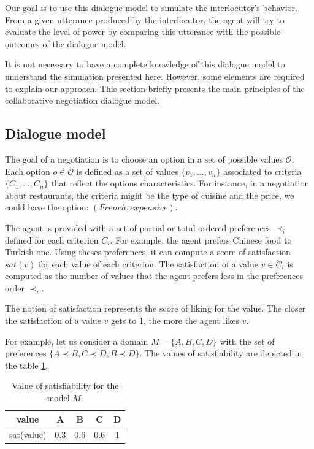 \documentclass[sigconf]{aamas}  %
\begin{document}
	Our goal is to use this dialogue model to simulate the interlocutor's behavior. From a given utterance produced by the interlocutor, the agent will try to evaluate the level of power by comparing this utterance with the possible outcomes of the dialogue model.
	
	It is not necessary to have a complete knowledge of this dialogue model to understand the simulation presented here. However, some elements are required to explain our approach. This section briefly presents the main principles of the collaborative negotiation dialogue model.
	
	\subsection{Dialogue model}
	\label{sec:dialogue-model}
	
	The goal of a negotiation is to choose an option in a set of possible values $\mathcal{O}$. Each option $o\in\mathcal{O}$ is defined as a set of values $\{v_1, ..., v_n\}$ associated to criteria $\{C_1, ..., C_n\}$ that reflect the options characteristics.  For instance, in a negotiation about restaurants, the criteria might be the type of cuisine and the price, we could have the option: $(French,expensive)$.
	
	The agent is provided with a set of partial or total ordered preferences $\prec_i$ defined for each criterion $C_i$. For example, the agent prefers Chinese food to Turkish one. Using theses preferences, it can compute a score of satisfaction $sat(v)$ for each value of each criterion. The satisfaction of a value $v \in C_i$ is computed as the number of values that the agent prefers less in the preferences order $\prec_i$.
	
%	
	The notion of satisfaction represents the score of liking for the value. The closer the satisfaction of a value $v$ gets to 1, the more the agent likes $v$.
	
	\par For example, let us consider a domain $M =\{A, B, C, D\}$ with the set of preferences $\{A \prec B, C \prec D , B \prec D \}$. The values of satisfiability are depicted in the table \ref{tab:sat}.
		\begin{table}
			\centering
			\begin{tabular}{ |c|c|c|c|c| }
				\hline				
				value & A & B & C & D \\
				\hline
				
				\hline
				sat(value) & 0.3 & 0.6 & 0.6 & 1 \\
				\hline
				
			\end{tabular}
			\caption{Value of satisfiability for the model $M$.}
			\label{tab:sat}
		\end{table}
	
\end{document}
